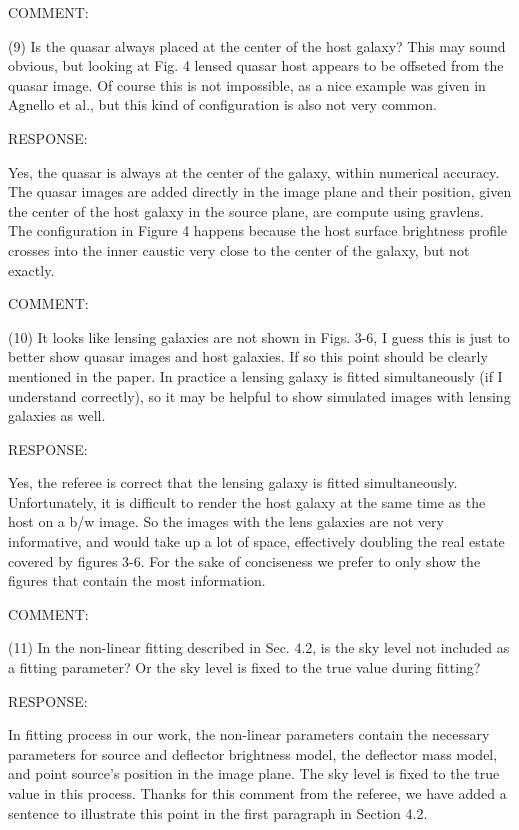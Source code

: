 \documentclass[a4paper,11pt]{article}
\begin{document}
COMMENT:

(9) Is the quasar always placed at the center of the host galaxy? This may sound obvious, but looking at Fig. 4 lensed quasar host appears to be offseted from the quasar image. Of course this is not impossible, as a nice example was given in Agnello et al., but this kind of configuration is also not very common.

RESPONSE:

Yes, the quasar is always at the center of the galaxy, within numerical accuracy. The quasar images are added directly in the image plane and their position, given the center of the host galaxy in the source plane, are compute using gravlens. The configuration in Figure 4 happens because the host surface brightness profile crosses into the inner caustic very close to the center of the galaxy, but not exactly.


COMMENT:

(10) It looks like lensing galaxies are not shown in Figs. 3-6, 
I guess this is just to better show quasar images and host galaxies. 
If so this point should be clearly mentioned in the paper. 
In practice a lensing galaxy is fitted simultaneously (if I understand correctly), 
so it may be helpful to show simulated images with lensing galaxies as well.

RESPONSE:

Yes, the referee is correct that the lensing galaxy is fitted
simultaneously. Unfortunately, it is difficult to render the host
galaxy at the same time as the host on a b/w image. So the images with
the lens galaxies are not very informative, and would take up a lot of
space, effectively doubling the real estate covered by figures
3-6. For the sake of conciseness we prefer to only show the figures
that contain the most information.


COMMENT:

(11) In the non-linear fitting described in Sec. 4.2, is the sky level 
not included as a fitting parameter? Or the sky level is fixed to the true value during fitting?


RESPONSE:

In fitting process in our work, the non-linear parameters contain
 the necessary parameters for source and deflector brightness model, 
 the deflector mass model, and point source's position in the image plane. 
 The sky level is fixed to the true value in this process. Thanks for this comment from the referee, 
 we have added a sentence to illustrate this point in the first paragraph in Section 4.2.
\end{document}
